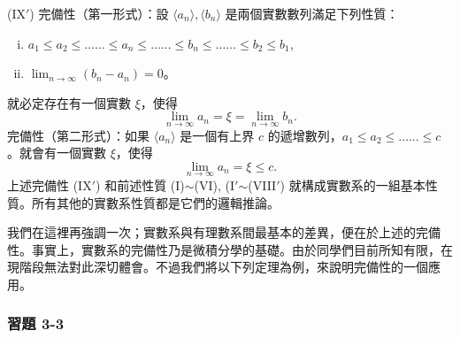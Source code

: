 (IX$'$) 完備性（第一形式）：設 $\langle a_n \rangle, \langle b_n \rangle$ 是兩個實數數列滿足下列性質：
\begin{enumerate}[(i)]
    \item $a_1 \le a_2 \le \dots\dots \le a_n \le \dots\dots \le b_n \le \dots\dots \le b_2 \le b_1$,
    \item $\lim_{n\to\infty}(b_n-a_n) = 0$。
\end{enumerate}
就必定存在有一個實數 $\xi$，使得
\[
\lim_{n\to\infty} a_n = \xi = \lim_{n\to\infty} b_n.
\]
完備性（第二形式）：如果 $\langle a_n \rangle$ 是一個有上界 $c$ 的遞增數列，$a_1 \le a_2 \le \dots\dots \le c$。就會有一個實數 $\xi$，使得
\[
\lim_{n\to\infty} a_n = \xi \le c.
\]
上述完備性 (IX$'$) 和前述性質 (I)$\sim$(VI), (I$'$$\sim$(VIII$'$) 就構成實數系的一組基本性質。所有其他的實數系性質都是它們的邏輯推論。

我們在這裡再強調一次；實數系與有理數系間最基本的差異，便在於上述的完備性。事實上，實數系的完備性乃是微積分學的基礎。由於同學們目前所知有限，在現階段無法對此深切體會。不過我們將以下列定理為例，來說明完備性的一個應用。

\subsubsection*{習題 3-3}

